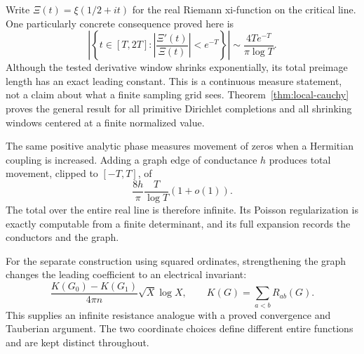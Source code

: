 \documentclass[11pt,letterpaper]{article}
\theoremstyle{remark}
\numberwithin{equation}{section}
\begin{document}
Write $\Xi(t)=\xi(1/2+it)$ for the real Riemann xi-function on the
critical line.  One particularly concrete consequence proved here is
\begin{equation*}
 \left|\left\{t\in[T,2T]:
        \left|\frac{\Xi'(t)}{\Xi(t)}\right|<e^{-T}\right\}\right|
       \sim\frac{4Te^{-T}}{\pi\log T}.
\end{equation*}
Although the tested derivative window shrinks exponentially, its total
preimage length has an exact leading constant.  This is a continuous
measure statement, not a claim about what a finite sampling grid sees.
Theorem~\ref{thm:local-cauchy} proves the general result for all primitive
Dirichlet completions and all shrinking windows centered at a finite
normalized value.

The same positive analytic phase measures movement of zeros when a
Hermitian coupling is increased.  Adding a graph edge of conductance $h$
produces total movement, clipped to $[-T,T]$, of
\[
 \frac{8h}{\pi}\frac{T}{\log T}(1+o(1)).
\]
The total over the entire real line is therefore infinite.  Its Poisson
regularization is exactly computable from a finite determinant, and its
full expansion records the conductors and the graph.

For the separate construction using squared ordinates, strengthening the
graph changes the leading coefficient to an electrical invariant:
\[
 \frac{K(G_0)-K(G_1)}{4\pi n}\sqrt X\log X,
 \qquad K(G)=\sum_{a<b}R_{ab}(G).
\]
This supplies an infinite resistance analogue with a proved convergence
and Tauberian argument.  The two coordinate choices define different
entire functions and are kept distinct throughout.







\end{document}

